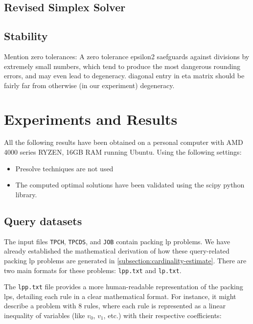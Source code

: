 \subsection{Revised Simplex Solver}


\subsection{Stability}
Mention zero tolerances: A zero tolerance epsilon2 saefguards against divisions
by extremely small numbers, which tend to produce the most dangerous rounding errors, and
may even lead to degeneracy. diagonal entry in eta matrix should be fairly far from
otherwise (in our experiment) degeneracy.


\section{Experiments and Results}
All the following results have been obtained on a personal computer with AMD 4000 series
RYZEN, 16GB RAM running Ubuntu. Using the following settings:
\begin{itemize}
    \item Presolve techniques are not used
    \item The computed optimal solutions have been validated using the scipy python library.
\end{itemize}

\subsection{Query datasets}
The input files \texttt{TPCH}, \texttt{TPCDS}, and \texttt{JOB} contain packing
\gls{lp} problems. We have already established the mathematical derivation of how
these query-related packing
\gls{lp} problems are generated in \ref{subsection:cardinality-estimate}.
There are two main formats for these problems:
\texttt{lpp.txt} and \texttt{lp.txt}.

The \texttt{lpp.txt} file provides a more human-readable representation of the
packing \glspl{lp}, detailing each rule in a clear mathematical format.
For instance, it might describe a problem with 8 rules,
where each rule is represented as a linear inequality of variables
(like \(v_0\), \(v_1\), etc.) with their respective coefficients:

